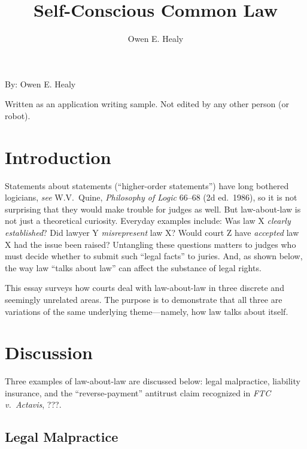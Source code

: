 \documentclass[
  12pt,
  letterpaper,
]{scrartcl}
\title{Self-Conscious Common Law}
\author{Owen E. Healy}
\begin{document}
\begin{center}\end{center}
  
\vspace{12pt}\noindent\begin{minipage}{4in}
  \setlength{\parskip}{6pt}
  
  \noindent By: Owen E. Healy

  \noindent Written as an application writing sample. Not edited by any other person (or robot).
\end{minipage}


\vspace{12pt}\section{Introduction}

Statements about statements (``higher-order statements'') have long bothered
logicians, \textit{see} W.V.~Quine, \textit{Philosophy of Logic} 66--68 (2d
ed.~1986), so it is not surprising that they would make trouble for judges as
well. But law-about-law is not just a theoretical curiosity. Everyday examples
include: Was law X \emph{clearly established}? Did lawyer Y \emph{misrepresent}
law X? Would court Z have \emph{accepted} law X had the issue been raised?
Untangling these questions matters to judges who must decide whether to submit
such ``legal facts'' to juries. And, as shown below, the way law ``talks about
law'' can affect the substance of legal rights.

This essay surveys how courts deal with law-about-law in three discrete and
seemingly unrelated areas. The purpose is to demonstrate that all three are
variations of the same underlying theme---namely, how law talks about itself.


\section{Discussion}

Three examples of law-about-law are discussed below: legal malpractice,
liability insurance, and the ``reverse-payment'' antitrust claim recognized
in \textit{FTC v.~Actavis}, ???.


\subsection{Legal Malpractice}
\end{document}
